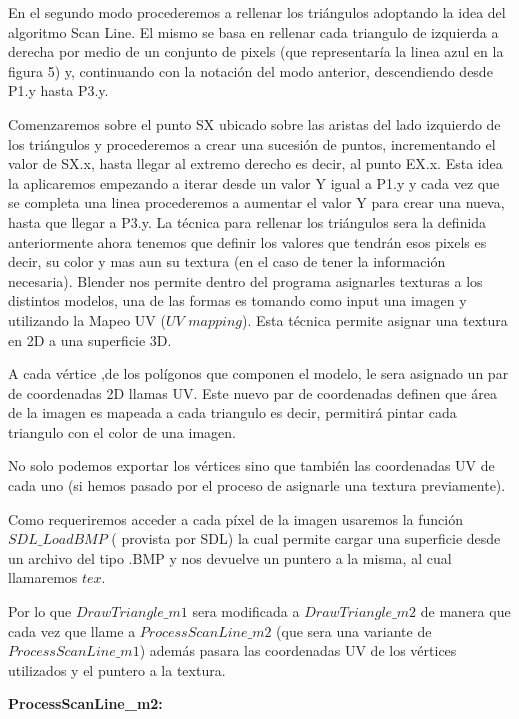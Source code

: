 \documentclass[a4paper]{article}
\newcounter{col}
\begin{document}
\par En el segundo modo procederemos a rellenar los triángulos adoptando la idea del algoritmo Scan Line. El mismo se basa en rellenar cada triangulo de izquierda a derecha por medio de un conjunto de pixels (que representaría la linea azul en la figura 5) y, continuando con la notación del modo anterior, descendiendo desde P1.y hasta P3.y.  
\par Comenzaremos sobre el punto SX ubicado sobre las aristas del lado izquierdo de los triángulos y procederemos a crear una sucesión de puntos, incrementando el valor de SX.x, hasta llegar al extremo derecho es decir, al punto EX.x. Esta idea la aplicaremos empezando a iterar desde un valor Y igual a P1.y y cada vez que se completa una linea procederemos a aumentar el valor Y para crear una nueva, hasta que llegar a P3.y. 
La técnica para rellenar los triángulos sera la definida anteriormente ahora tenemos que definir los valores que tendrán esos pixels es decir, su color y mas aun su textura (en el caso de tener la información necesaria).
Blender nos permite dentro del programa asignarles texturas a los distintos modelos, una de las formas es tomando como input una imagen y utilizando la Mapeo UV ($UV$ $mapping$). Esta técnica permite asignar una textura en 2D a una superficie 3D. 
\par A cada vértice ,de los polígonos que componen el modelo, le sera asignado un par de coordenadas 2D llamas UV. Este nuevo par de coordenadas definen que área de la imagen es mapeada a cada triangulo es decir, permitirá pintar cada triangulo con el color de una imagen. 
\par No solo podemos exportar los vértices sino que también las coordenadas UV de cada uno (si hemos pasado por el proceso de asignarle una textura previamente).
\par Como requeriremos acceder a cada píxel de la imagen usaremos la función $SDL\_LoadBMP$ ( provista por SDL) la cual permite cargar una superficie desde un archivo del tipo .BMP y nos devuelve un puntero a la misma, al cual llamaremos $tex$.    
 
\par Por lo que $DrawTriangle\_m1$ sera modificada a $DrawTriangle\_m2$ de manera que cada vez que llame a $ProcessScanLine\_m2$ (que sera una variante de $ProcessScanLine\_m1$) además pasara las coordenadas UV de los vértices utilizados y el puntero a la textura.
 
\textbf{ProcessScanLine\_m2:} 
\end{document}
